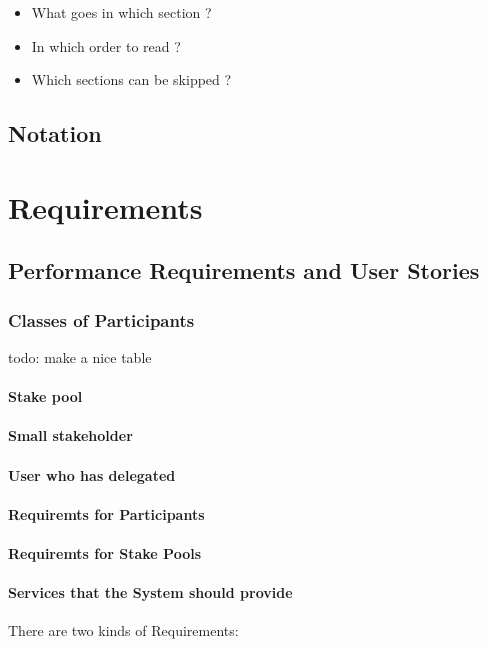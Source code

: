 \documentclass{report}
\theoremstyle{definition}{
  \newtheorem{lemma}{Lemma}[section] %
  \newtheorem{definition}[lemma]{Definition}
}
\theoremstyle{theorem}{
  \newtheorem{invariant}[lemma]{Invariant}
  \newtheorem{proofobligation}[lemma]{Proof Obligation}
}
\numberwithin{equation}{lemma}
\begin{document}
\begin{itemize}
  \item What goes in which section ?
  \item In which order to read ?
  \item Which sections can be skipped ?
\end{itemize}

\section{Notation}

\chapter{Requirements}

\section{Performance Requirements and User Stories}
\subsection{Classes of Participants}
todo: make a nice table
\subsubsection{Stake pool} %
\subsubsection{Small stakeholder}
\subsubsection{User who has delegated}
\subsubsection{Requiremts for Participants}
\subsubsection{Requiremts for Stake Pools}
\subsubsection{Services that the System should provide}

There are two kinds of Requirements:
\end{document}
